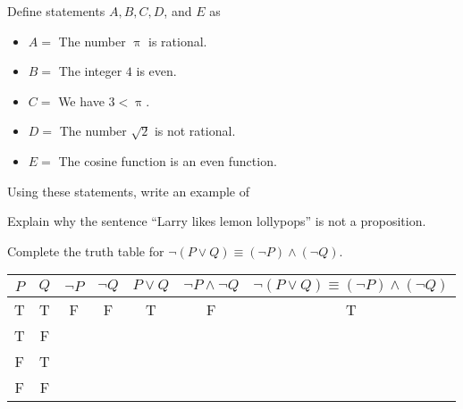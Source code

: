 \documentclass[12pt,fleqn]{exam}
\begin{document}
\begin{questions} 

\question [5] Define statements $A,B,C,D$, and $E$ as
\begin{itemize}
\item $A = $ The number $\uppi$ is rational.
\item $B = $ The integer  $4$ is even.
\item $C = $ We have $3 < \uppi$.
\item $D = $ The number $\sqrt{2}$ is not rational.
\item $E = $ The cosine function is an even function.
\end{itemize}

Using these statements, write an example of 


\question[5] Explain why the sentence ``Larry likes lemon lollypops''
is not a proposition.

\question [5] Complete the truth table for $\lnot  (P \lor Q) \equiv (\lnot P) \land (\lnot  Q)$.

\vspace{0.1in}
\begin{tabular}{|c|c|c|c|c|c|c|}
\hline 
\(P\) & \(Q\) & \(\lnot P \) & \(\lnot Q \) & \(P \lor Q\) & \(\lnot P \land  \lnot  Q\) & \(\lnot  (P \lor Q) \equiv (\lnot P)\land (\lnot  Q) \) \\  \hline \hline
 T  & T & F & F & T & F & T   \\  \hline
 T  & F &   &   &   &   &     \\ \hline 
 F  & T &   &   &   &   &     \\ \hline 
 F  & F &   &   &   &   &     \\ \hline 
\end{tabular}



\begin{solution} 
\end{solution}




\end{questions}
\end{document}
